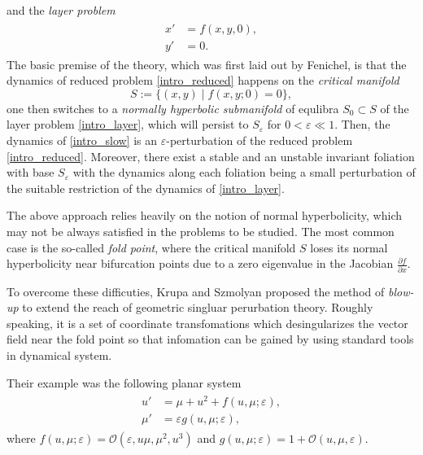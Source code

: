 \documentclass[letterpaper,11pt]{article}
\newcommand{\rmO}{\mathcal{O}}
\newcommand{\eps}{\varepsilon}
\numberwithin{equation}{section}
\theoremstyle{plain}
\begin{document}
and the \textit{layer problem}
\begin{align}\label{intro_layer}
\begin{split}
x' &=  f(x,y,0),\\
y' &=  0. 
\end{split}
\end{align}
The basic premise of the theory, which was first laid out by Fenichel, is that the dynamics of reduced problem \eqref{intro_reduced} happens on the \textit{critical manifold}
\[
S:=  \{ (x,y) \mid f(x,y;0) = 0 \},
\]
one then switches to a \textit{normally hyperbolic submanifold} of equlibra $S_0 \subset S$ of the layer problem \eqref{intro_layer}, which will persist to $S_\eps$ for $0<\eps \ll 1$. Then, the dynamics of \eqref{intro_slow} is an $\eps$-perturbation of the reduced problem \eqref{intro_reduced}. Moreover, there exist a stable and an unstable invariant foliation with base $S_\eps$ with the dynamics along each foliation being a small perturbation of the suitable restriction of the dynamics of \eqref{intro_layer}.

The above approach relies heavily on the notion of normal hyperbolicity, which may not be always satisfied in the problems to be studied. The most common case is the so-called \textit{fold point}, where the critical manifold $S$ loses its normal hyperbolicity near bifurcation points due to a zero eigenvalue in the Jacobian $\frac{\partial f }{\partial x}$.

To overcome these difficuties, Krupa and Szmolyan proposed the method of \textit{blow-up} to extend the reach of geometric singluar perurbation theory. Roughly speaking, it is a set of coordinate transfomations which desingularizes the vector field near the fold point so that infomation can be gained by using standard tools in dynamical system.


Their example was the following planar system 
\begin{align}\label{ori_eqn}
\begin{split}
u' &= \mu+u^2+ f(u,\mu; \eps),\\
\mu' &=  \eps g(u,\mu; \eps),
\end{split}
\end{align}
where $f(u,\mu;\eps) = \rmO(\eps, u\mu,\mu^2,u^3)$ and $g(u,\mu;\eps) = 1+\rmO(u,\mu,\eps)$. 
\end{document}
